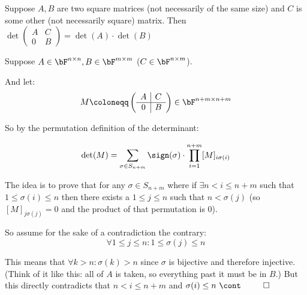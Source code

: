 \documentclass[10pt]{article}
\begin{document}
\newpage
\begin{lemma}{Suppose $A, B$ are two square matrices (not necessarily of the same size) and $C$ is some other (not necessarily square) matrix. Then $\det\left(\begin{array}{c|c}A & C \\ \hline 0 & B\end{array}\right)=\det(A)\cdot\det(B)$}

Suppose $A\in\bF^{n\times n}, B\in\bF^{m\times m}$ ($C\in\bF^{n\times m}$).

And let:
\[ M \coloneqq \left(\begin{array}{c|c}A & C \\ \hline 0 & B\end{array}\right) \in\bF^{n+m\times n+m}\]

So by the permutation definition of the determinant:

\[ \det(M) = \sum_{\sigma\in S_{n+m}} \sign(\sigma)\cdot\prod_{i=1}^{n+m} [M]_{i\sigma(i)} \]

The idea is to prove that for any $\sigma\in S_{n+m}$ where if  $\exists n<i\leq n+m$ such that $1\leq\sigma(i)\leq n$ then there exists a $1\leq j\leq n$ such that $n<\sigma(j)$ (so $[M]_{j\sigma(j)}=0$ and the product of that permutation is $0$).

So assume for the sake of a contradiction the contrary:
\[ \forall 1\leq j\leq n: 1\leq\sigma(j)\leq n \]

This means that $\forall k>n: \sigma(k)>n$ since $\sigma$ is bijective and therefore injective. (Think of it like this: all of $A$ is taken, so everything past it must be in $B$.) But this directly contradicts that $n<i\leq n+m$ and $\sigma(i)\leq n ~ \cont ~~ \qed$

\end{lemma}
\end{document}

